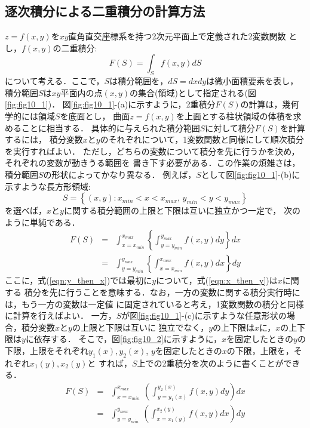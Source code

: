 \documentclass[10pt,a4j]{jbook}
\begin{document}
\subsection{逐次積分による二重積分の計算方法}
$z=f(x,y)$を$xy$直角直交座標系を持つ2次元平面上で定義された2変数関数
とし，$f(x,y)$の二重積分:
\begin{equation}
	F(S)=\int_S f(x,y) dS
	\label{eqn:Int2D}
\end{equation}
について考える．ここで，$S$は積分範囲を，$dS=dxdy$は微小面積要素を表し，
積分範囲$S$は$xy$平面内の点$(x,y)$の集合(領域)として指定される(図\ref{fig:fig10_1})．
図\ref{fig:fig10_1}-(a)に示すように，2重積分$F(S)$の計算は，幾何学的には領域$S$を底面とし，
曲面$z=f(x,y)$を上面とする柱状領域の体積を求めることに相当する．
具体的に与えられた積分範囲$S$に対して積分$F(S)$を計算するには，
積分変数$x$と$y$のそれぞれについて，1変数関数と同様にして順次積分を実行すればよい．
ただし，どちらの変数について積分を先に行うかを決め，それぞれの変数が動きうる範囲を
書き下す必要がある．この作業の煩雑さは，積分範囲$S$の形状によってかなり異なる．
例えば，$S$として図\ref{fig:fig10_1}-(b)に示すような長方形領域:
\begin{equation}
	S=\left\{(x,y):x_{min}<x<x_{max}, \, y_{min}<y<y_{max} \right\}
	\label{eqn:Sa}
\end{equation}
を選べば，$x$と$y$に関する積分範囲の上限と下限は互いに独立かつ一定で，
次のように単純である．
\begin{eqnarray}
	F(S)
	&=&
	\int_{x=x_{min}}^{x_{max}}\left\{\int_{y=y_{min}}^{y_{max}} f(x,y)dy\right\} dx
	\label{eqn:y_then_x}
	\\
	&=&
	\int_{y=y_{min}}^{y_{max}}\left\{\int_{x=x_{min}}^{x_{max}} f(x,y)dx\right\} dy
	\label{eqn:x_then_y}
\end{eqnarray}
ここに，式(\ref{eqn:y_then_x})では最初に$y$について，式(\ref{eqn:x_then_y})は$x$に関する
積分を先に行うことを意味する．なお，一方の変数に関する積分実行時には，もう一方の変数は一定値
に固定されていると考え，1変数関数の積分と同様に計算を行えばよい．
一方，$S$が図\ref{fig:fig10_1}-(c)に示すような任意形状の場合，積分変数$x$と$y$の上限と下限は互いに
独立でなく，$y$の上下限は$x$に，$x$の上下限は$y$に依存する．
そこで，図\ref{fig:fig10_2}に示すように，$x$を固定したときの$y$の下限，上限をそれぞれ$y_1(x),y_2(x)$,
$y$を固定したときの$x$の下限，上限を，それぞれ$x_1(y),x_2(y)$と
すれば，$S$上での2重積分を次のように書くことができる．
\begin{eqnarray}
	F(S) &=& 
	\int_{x=x_{min}}^{x_{max}}\ \left( \int_{y=y_1(x)}^{y_2(x)}f(x,y)dy\right) dx
	\label{eqn:iint_xy}
	\\
	&=& 
	\int_{y=y_{min}}^{y_{max}}\ \left( \int_{x=x_1(y)}^{x_2(y)}f(x,y)dx\right) dy
	\label{eqn:iint_yx}
\end{eqnarray}
\end{document}
